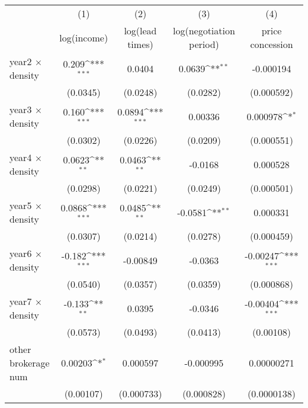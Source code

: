{
\def\sym#1{\ifmmode^{#1}\else\(^{#1}\)\fi}
\begin{tabular}{l*{4}{c}}
\toprule
            &\multicolumn{1}{c}{(1)}&\multicolumn{1}{c}{(2)}&\multicolumn{1}{c}{(3)}&\multicolumn{1}{c}{(4)}\\
            &\multicolumn{1}{c}{log(income)}&\multicolumn{1}{c}{log(lead times)}&\multicolumn{1}{c}{log(negotiation period)}&\multicolumn{1}{c}{price concession}\\
\midrule
year2 $\times$ density&       0.209\sym{***}&      0.0404         &      0.0639\sym{**} &   -0.000194         \\
            &    (0.0345)         &    (0.0248)         &    (0.0282)         &  (0.000592)         \\
\addlinespace
year3 $\times$ density&       0.160\sym{***}&      0.0894\sym{***}&     0.00336         &    0.000978\sym{*}  \\
            &    (0.0302)         &    (0.0226)         &    (0.0209)         &  (0.000551)         \\
\addlinespace
year4 $\times$ density&      0.0623\sym{**} &      0.0463\sym{**} &     -0.0168         &    0.000528         \\
            &    (0.0298)         &    (0.0221)         &    (0.0249)         &  (0.000501)         \\
\addlinespace
year5 $\times$ density&      0.0868\sym{***}&      0.0485\sym{**} &     -0.0581\sym{**} &    0.000331         \\
            &    (0.0307)         &    (0.0214)         &    (0.0278)         &  (0.000459)         \\
\addlinespace
year6 $\times$ density&      -0.182\sym{***}&    -0.00849         &     -0.0363         &    -0.00247\sym{***}\\
            &    (0.0540)         &    (0.0357)         &    (0.0359)         &  (0.000868)         \\
\addlinespace
year7 $\times$ density&      -0.133\sym{**} &      0.0395         &     -0.0346         &    -0.00404\sym{***}\\
            &    (0.0573)         &    (0.0493)         &    (0.0413)         &   (0.00108)         \\
\addlinespace
other brokerage num  &     0.00203\sym{*}  &    0.000597         &   -0.000995         &  0.00000271         \\
            &   (0.00107)         &  (0.000733)         &  (0.000828)         & (0.0000138)         \\

\end{tabular}}
